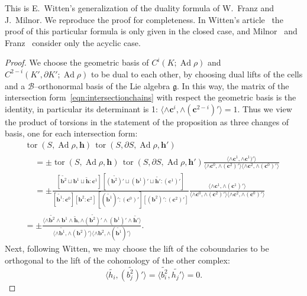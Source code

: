 \documentclass[11pt]{article}
\theoremstyle{definition}
\numberwithin{equation}{section}
\numberwithin{figure}{section}
\numberwithin{table}{section}
\DeclareMathOperator{\tor}{tor}
\DeclareMathOperator{\Ad}{Ad}
\newcommand{\Bcal}{\mathcal{B}}
\newcommand{\gfrk}{\mathfrak{g}}
\newcommand{\cbf}{\mathbf{c}}
\newcommand{\bbf}{\mathbf{b}}
\newcommand{\hbf}{\mathbf{h}}
\begin{document}
This is E.~Witten's generalization of the duality formula of W.~Franz and J.~Milnor. We reproduce the proof for completeness. In Witten's article~\cite{Witten} the proof of this particular formula is only given in the closed case, and Milnor~\cite{MilnorDuality} and Franz~\cite{Franz37} consider only the acyclic case.


\begin{proof}
We choose the geometric basis of $C^i(K;\Ad\rho)$ and $C^{2-i}(K',\partial K';\Ad\rho)$ to be dual to each other, by choosing dual lifts of the cells and a $\Bcal$--orthonormal basis of the Lie algebra $\gfrk$. In this way, the matrix of the intersection form~\eqref{eqn:intersectionchains} with respect the geometric basis is the identity, in particular its determinant is 1: $\langle \wedge\cbf^i, \wedge(\cbf^{2-i})'\rangle=1$. Thus we view the product of torsions in the statement of the proposition as three changes of basis, one for each intersection form:
\begin{multline}\label{eqn:producttorsions}
\tor(S,\Ad\rho, {\hbf}) \,
\tor(S,\partial S,\Ad\rho, {\hbf}')\\
\begin{aligned}
&= \pm
\tor(S,\Ad\rho, {\hbf}) \,
\tor(S,\partial S,\Ad\rho, {\hbf}') \frac{\langle \wedge\cbf^1, \wedge\cbf^1)'\rangle}{\langle \wedge\cbf^0, \wedge(\cbf^2)'\rangle
\langle \wedge\cbf^2, \wedge(\cbf^0)'\rangle}
\\
&= \pm
\frac{[\widetilde{\bbf^2}\sqcup {\bbf^1}\sqcup \widetilde{\hbf} : \cbf^1]\, [\widetilde{(\bbf^2)'}\sqcup {(\bbf^1)'}\sqcup \widetilde{\hbf'} : (\cbf^1)'] }{ [\widetilde{\bbf^1} : \cbf^0] [{\bbf^2} : \cbf^2] \, [(\widetilde{\bbf^1})' : (\cbf^0)'] [({\bbf^2})' : (\cbf^2)']}
\frac{\langle \wedge\cbf^1, \wedge(\cbf^1)'\rangle}{\langle \wedge\cbf^0, \wedge(\cbf^2)'\rangle
\langle \wedge\cbf^2, \wedge(\cbf^0)'\rangle}
\end{aligned}
\\
= \pm \frac{
\langle \wedge \widetilde{\bbf^2} \wedge {\bbf^1} \wedge \widetilde{\hbf},
\wedge \widetilde{(\bbf^2)'} \wedge (\bbf^1)'\wedge \widetilde{\hbf'}
\rangle }{
\langle \wedge \widetilde{\bbf^1},\wedge ({\bbf^2})' \rangle
\langle \wedge {\bbf^2}, \wedge (\widetilde{\bbf^1})' \rangle }.
\end{multline}
Next, following Witten, we may choose the lift of the coboundaries to be orthogonal to the lift of the cohomology of the other complex:
\[
\langle \widetilde{ h_i}, \widetilde{(b^2_j)'} \rangle =
\langle \widetilde{ b^2_i}, \widetilde{ h_j'}\rangle =0.
\]
\end{proof}
\end{document}
